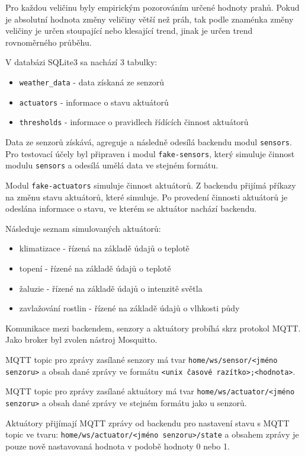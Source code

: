 \documentclass[11pt,a4paper]{article}
\begin{document}
Pro každou veličinu byly empirickým pozorováním určené hodnoty prahů.
Pokud je absolutní hodnota změny veličiny větší než práh, tak podle znaménka změny veličiny je určen stoupající nebo klesající trend, jinak je určen trend rovnoměrného průběhu.

V databázi SQLite3 sa nachází 3 tabulky:
\begin{itemize}
    \item \texttt{weather\_data} - data získaná ze senzorů
    \item \texttt{actuators} - informace o stavu aktuátorů
    \item \texttt{thresholds} - informace o pravidlech řídících činnost aktuátorů
\end{itemize}

Data ze senzorů získává, agreguje a následně odesílá backendu modul \texttt{sensors}.
Pro testovací účely byl připraven i modul \texttt{fake-sensors}, který simuluje
činnost modulu \texttt{sensors} a odesílá umělá data ve stejném formátu.

Modul \texttt{fake-actuators} simuluje činnost aktuátorů.
Z backendu přijímá příkazy na změnu stavu aktuátorů, které simuluje.
Po provedení činnosti aktuátorů je odeslána informace o stavu, ve kterém
se aktuátor nachází backendu.

Následuje seznam simulovaných aktuátorů:
\begin{itemize}
    \item klimatizace - řízená na základě údajů o teplotě
    \item topení - řízené na základě údajů o teplotě
    \item žaluzie - řízené na základě údajů o intenzitě světla
    \item zavlažování rostlin - řízené na základě údajů o vlhkosti půdy
\end{itemize}

Komunikace mezi backendem, senzory a aktuátory probíhá skrz protokol MQTT. Jako broker byl zvolen nástroj Mosquitto.

MQTT topic pro zprávy zasílané senzory má tvar \texttt{home/ws/sensor/<jméno senzoru>} a obsah dané zprávy ve formátu \texttt{<unix časové razítko>;<hodnota>}.

MQTT topic pro zprávy zasílané aktuátory má tvar \texttt{home/ws/actuator/<jméno senzoru>} a obsah dané zprávy ve stejném formátu jako u senzorů.

Aktuátory přijímají MQTT zprávy od backendu pro nastavení stavu s MQTT topic ve tvaru: \texttt{home/ws/actuator/<jméno senzoru>/state} a obsahem zprávy je pouze nově nastavovaná hodnota v podobě hodnoty 0 nebo 1.
\end{document}
